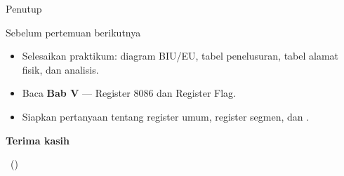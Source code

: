 \documentclass[aspectratio=169,11pt]{beamer}
\begin{document}
\begin{frame}{Penutup}
\begin{block}{Sebelum pertemuan berikutnya}
\small
\begin{itemize}
    \item Selesaikan praktikum: diagram BIU/EU, tabel penelusuran,
          tabel alamat fisik, dan analisis.
    \item Baca \textbf{Bab V} — Register 8086 dan Register Flag.
    \item Siapkan pertanyaan tentang register umum, register segmen,
          dan .
\end{itemize}
\end{block}

\vspace{0.4em}
\begin{center}
{\color{obeBlue}\sffamily\large\bfseries Terima kasih\par}
\vspace{0.15em}
{\color{obeGray}\sffamily\small \NamaMK\ (\KodeMK)
\textbullet\ \SemesterTeks\par}
\end{center}
\end{frame}
\end{document}
